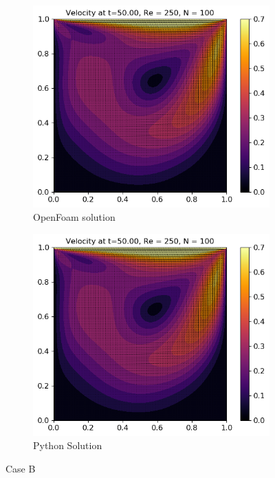 \documentclass[10pt]{report}
\begin{document}
\begin{figure}[H]
    \centering
    \begin{subfigure}[b]{0.475\textwidth}
        \centering
        \includegraphics[width=\textwidth]{plots/velocity_RE250_OF.png}
        \caption{OpenFoam solution}
        \label{caseBof}
    \end{subfigure}
    \hfill
    \begin{subfigure}[b]{0.475\textwidth}
        \centering
        \includegraphics[width=\textwidth]{plots/velocity_RE250.png}
        \caption{Python Solution}
        \label{caseBpy}
    \end{subfigure}
    \caption{Case B}
    \label{caseB}
\end{figure}
\end{document}

